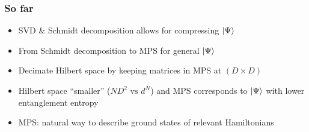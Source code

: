 \documentclass{beamer}
\theoremstyle{definition}
\begin{document}
\begin{frame}
	\frametitle{So far}
	\begin{itemize}
		\item SVD \& Schmidt decomposition allows for compressing $\ket{\Psi}$ 
		\vspace{10pt}
		
		\item From Schmidt decomposition to MPS for general $\ket{\Psi}$
		\vspace{10pt}
		
		\item Decimate Hilbert space by keeping matrices in MPS at $(D\times D)$
		\vspace{10pt}
		
		\item Hilbert space ``smaller'' ($ND^2 \text{ vs } d^N$) and MPS  corresponds to $\ket{\Psi}$ with lower entanglement entropy
		\vspace{10pt}
		
		\item MPS: natural way to describe ground states of relevant Hamiltonians 
	\end{itemize}
	
\end{frame}
\end{document}
